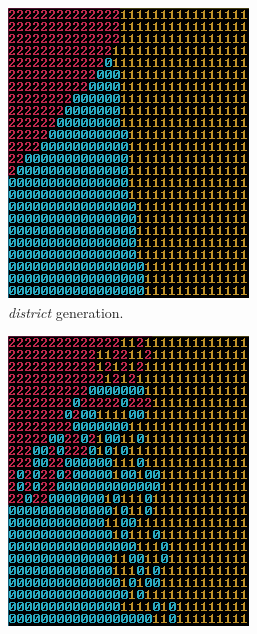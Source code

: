 		\begin{figure}[h]
			\begin{subfigure}{0.5\textwidth}
				\centering
				\includegraphics[width=0.9\linewidth]{"Images/map districts colored"}
				\caption{\textit{district} generation.}
				\label{fig:map-districts}
			\end{subfigure}
			\begin{subfigure}{0.5\textwidth}
				\centering
				\includegraphics[width=0.9\linewidth]{"Images/map borders colored"}

\end{subfigure}
\end{figure}
